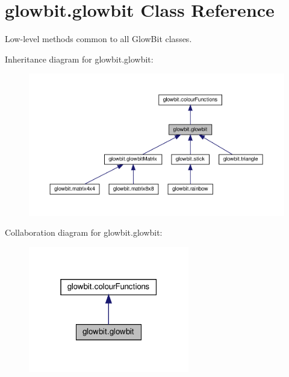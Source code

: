 \hypertarget{classglowbit_1_1glowbit}{}\section{glowbit.\+glowbit Class Reference}
\label{classglowbit_1_1glowbit}


Low-\/level methods common to all Glow\+Bit classes.  




Inheritance diagram for glowbit.\+glowbit\+:\nopagebreak
\begin{figure}[H]
\begin{center}
\leavevmode
\includegraphics[width=350pt]{classglowbit_1_1glowbit__inherit__graph}
\end{center}
\end{figure}


Collaboration diagram for glowbit.\+glowbit\+:\nopagebreak
\begin{figure}[H]
\begin{center}
\leavevmode
\includegraphics[width=199pt]{classglowbit_1_1glowbit__coll__graph}
\end{center}
\end{figure}
